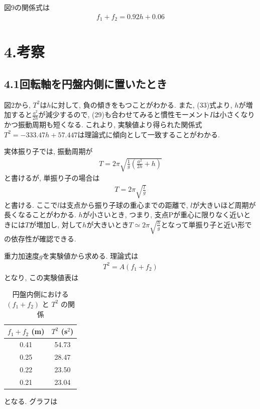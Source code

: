 \documentclass{jlreq}
\begin{document}
図9の関係式は
\begin{align}
    f_1+f_2 = 0.92h + 0.06
\end{align}



















\section*{4.考察}
\subsection*{4.1回転軸を円盤内側に置いたとき}
図2から, $T^2$は$h$に対して, 負の傾きをもつことがわかる. また, (33)式より, $h$が増加すると$\frac{a^2}{2h}$が減少するので, (29)も合わせてみると慣性モーメント$I$は小さくなりかつ振動周期も短くなる. これより, 実験値より得られた関係式$T^2 = -333.47h + 57.447$は理論式に傾向として一致することがわかる.\par

実体振り子では, 振動周期が
\begin{align}
  T = 2\pi \sqrt{\frac{1}{g} (\frac{a^2}{2h} + h)}
\end{align}
と書けるが, 単振り子の場合は
\begin{align}
  T = 2\pi \sqrt{\frac{l}{g}}
\end{align}
と書ける. ここで$l$は支点から振り子球の重心までの距離で, $l$が大きいほど周期が長くなることがわかる. $h$が小さいとき, つまり, 支点Pが重心に限りなく近いときには$T$が増加し, 対して$h$が大きいとき$T \simeq 2\pi \sqrt{\frac{h}{g}}$となって単振り子と近い形での依存性が確認できる.\par

重力加速度$g$を実験値から求める. 理論式は
\begin{align}
  T^2 = A(f_1+f_2)
\end{align}
となり, この実験値表は


\begin{table}[htbp]
  \centering
  \caption{円盤内側における $(f_1 + f_2)$ と $T^2$ の関係}
  \begin{tabular}{cc}
    \toprule
    \textbf{$f_1 + f_2$ (m)} & \textbf{$T^2$ (s$^2$)} \\
    \midrule
    0.41 & 54.73 \\
    0.25 & 28.47 \\
    0.22 & 23.50 \\
    0.21 & 23.04 \\
    \bottomrule
  \end{tabular}
  \label{tab:disk_inner}
\end{table}
となる. グラフは
\end{document}
